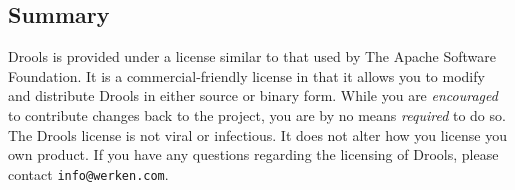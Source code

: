 \subsection{Summary}

Drools is provided under a license similar to that used by
The Apache Software Foundation.  It is a commercial-friendly license
in that it allows you to modify and distribute Drools in either
source or binary form.  While you are \emph{encouraged} to contribute
changes back to the project, you are by no means \emph{required} to
do so.   The Drools license is not viral or infectious.  It
does not alter how you license you own product.  If you have any
questions regarding the licensing of Drools, please contact
\verb|info@werken.com|.

